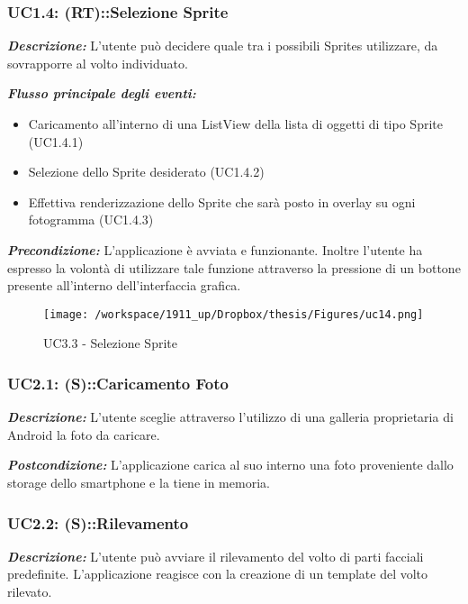 \subsubsection{UC1.4: (RT)::Selezione Sprite}

\textbf{\textit{Descrizione:}} L'utente può decidere quale tra i possibili Sprites utilizzare, da sovrapporre al volto individuato.

\textbf{\textit{Flusso principale degli eventi:}} 

\begin{itemize}
\item Caricamento all'interno di una ListView della lista di oggetti di tipo Sprite (UC1.4.1)
\item Selezione dello Sprite desiderato (UC1.4.2)
\item Effettiva renderizzazione dello Sprite che sarà posto in overlay su ogni fotogramma (UC1.4.3)
\end{itemize}

\textbf{\textit{Precondizione:}} L'applicazione è avviata e funzionante. Inoltre l'utente ha espresso la volontà di utilizzare tale funzione attraverso la pressione di un bottone presente all'interno dell'interfaccia grafica.

\begin{figure}[H]\centering  
\texttt{[image: /workspace/1911\_up/Dropbox/thesis/Figures/uc14.png]}
\caption[UC1.4 - Selezione Sprite]{UC3.3 - Selezione Sprite}
\label{pic-a}
\end{figure}

\subsubsection{UC2.1: (S)::Caricamento Foto}

\textbf{\textit{Descrizione:}} L'utente sceglie attraverso l'utilizzo di una galleria proprietaria di Android la foto da caricare.

\textbf{\textit{Postcondizione:}} L'applicazione carica al suo interno una foto proveniente dallo storage dello smartphone e la tiene in memoria.


\subsubsection{UC2.2: (S)::Rilevamento}

\textbf{\textit{Descrizione:}} L'utente può avviare il rilevamento del volto di parti facciali predefinite. L'applicazione reagisce con la creazione di un template del volto rilevato.


